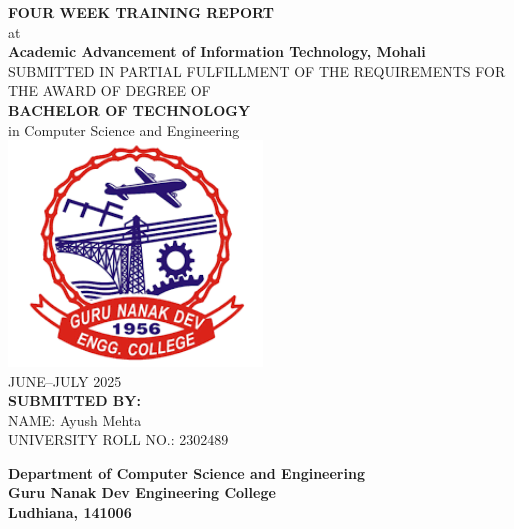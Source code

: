 \documentclass[a4paper,12pt,oneside]{report}
\numberwithin{equation}{chapter}
\numberwithin{figure}{chapter}
\numberwithin{table}{chapter}
\begin{document}
\setcounter{page}{1}

\begin{titlepage}
\begin{center}
    \Large\textbf{FOUR WEEK TRAINING REPORT}\\[3mm]
    \large{at}\\[3mm]
    \Large\textbf{Academic Advancement of Information Technology, Mohali}\\[6mm]
    \normalsize{SUBMITTED IN PARTIAL FULFILLMENT OF THE REQUIREMENTS FOR THE AWARD OF DEGREE OF}\\[3mm]
    \Large\textbf{BACHELOR OF TECHNOLOGY}\\[3mm]
    \large{in Computer Science and Engineering}\\[9mm]
    \includegraphics[height=6cm]{gndeclogo.png}\\[6mm]
    \large{JUNE–JULY 2025}\\[9mm]
    \textbf{SUBMITTED BY:}\\
    NAME: Ayush Mehta\\
    UNIVERSITY ROLL NO.: 2302489
\end{center}

\vspace{10mm}
\begin{center}
    \textbf{Department of Computer Science and Engineering}\\
    \textbf{Guru Nanak Dev Engineering College}\\
    \textbf{Ludhiana, 141006}
\end{center}
\end{titlepage}
\end{document}
